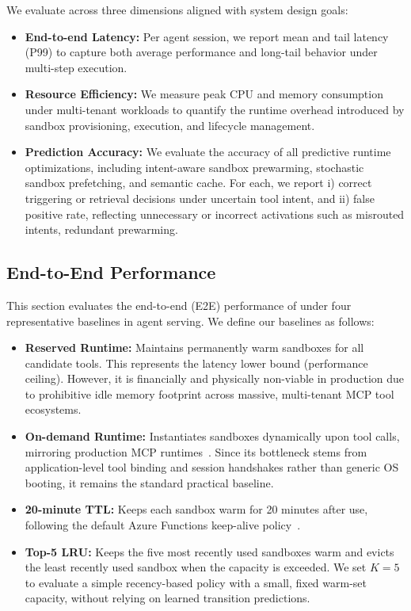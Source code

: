 We evaluate \SystemName across three dimensions aligned with system design goals:
\begin{itemize}[leftmargin=1.2em]
    \item \textbf{End-to-end Latency:} Per agent session, we report mean and tail latency (P99) to capture both average performance and long-tail behavior under multi-step execution.
    \item \textbf{Resource Efficiency:} We measure peak CPU and memory consumption under multi-tenant workloads to quantify the runtime overhead introduced by sandbox provisioning, execution, and lifecycle management.
   \item \textbf{Prediction Accuracy:} We evaluate the accuracy of all predictive runtime optimizations, including intent-aware sandbox prewarming, stochastic sandbox prefetching, and semantic cache. For each, we report i) correct triggering or retrieval decisions under uncertain tool intent, and ii) false positive rate, reflecting unnecessary or incorrect activations such as misrouted intents, redundant prewarming.
\end{itemize}


\subsection{End-to-End Performance}
\label{sec:exp:end_to_end}

This section evaluates the end-to-end (E2E) performance of \SystemName under four representative baselines in agent serving. We define our baselines as follows:
\begin{itemize}[leftmargin=1.2em]
    \item \textbf{Reserved Runtime:} Maintains permanently warm sandboxes for all candidate tools. This represents the latency lower bound (performance ceiling). However, it is financially and physically non-viable in production due to prohibitive idle memory footprint across massive, multi-tenant MCP tool ecosystems.
    \item \textbf{On-demand Runtime:} Instantiates sandboxes dynamically upon tool calls, mirroring production MCP runtimes~\cite{aws2026,azure2026,gcp2026}. Since its bottleneck stems from application-level tool binding and session handshakes rather than generic OS booting, it remains the standard practical baseline.
    \item \textbf{20-minute TTL:} Keeps each sandbox warm for 20 minutes after use, following the default Azure Functions keep-alive policy~\cite{shahrad2020serverless}.
    \item \textbf{Top-5 LRU:} Keeps the five most recently used sandboxes warm and evicts the least recently used sandbox when the capacity is exceeded. We set $K=5$ to evaluate a simple recency-based policy with a small, fixed warm-set capacity, without relying on learned transition predictions.
\end{itemize}

